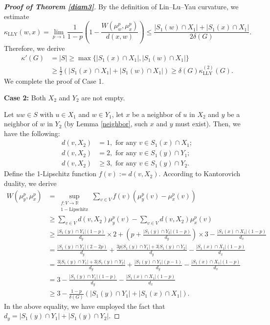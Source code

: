 \documentclass[11pt,bezier]{article}
\theoremstyle{definition}
\theoremstyle{definition}
\theoremstyle{nonumber}
\begin{document}
\begin{proof}[\bf{Proof of Theorem \ref{diam3}}]
By the definition of Lin--Lu--Yau curvature, we estimate
$$
\kappa_{\mathrm{LLY}}(w, x) = \lim_{p \to 1} \frac{1}{1-p} \left( 1 - \frac{W(\mu_w^p, \mu_x^p)}{d(x, w)} \right) \leq \frac{|S_1(w) \cap X_1| + |S_1(x) \cap X_1|}{2\delta(G)}.
$$
Therefore, we derive
\begin{align*}
\kappa'(G) &= |S| \geq \max\{|S_1(x) \cap X_1|, |S_1(w) \cap X_1|\}\\
&\geq \frac{1}{2} (|S_1(x) \cap X_1| + |S_1(w) \cap X_1|) \geq \delta(G) \kappa_{\mathrm{LLY}}^{(2)}(G).
\end{align*}
We complete the proof of Case 1.

\textbf{Case 2:} Both $X_2$ and $Y_2$ are not empty.

Let $uw \in S$ with $u\in X_1$ and $w\in Y_1$,  let $x$ be a neighbor of $u$ in $X_2$ and $y$ be a neighbor of $w$ in $Y_2$ (by Lemma \ref{neighbor}, such $x$ and $y$ must exist). Then, we have the following:
\begin{align*} 
d(v, X_2) &= 1, \text{ for any } v \in S_1(x) \cap X_1;\\
d(v, X_2) &= 2, \text{ for any } v \in S_1(y) \cap Y_1;\\
d(v, X_2) &\geq 3, \text{ for any } v \in S_1(y) \cap Y_2.
\end{align*}
Define the 1-Lipschitz function $f(v):=d(v, X_2)$. According to Kantorovich duality, we derive
\begin{align*}
W(\mu_y^p, \mu_x^p) &= \sup_{\substack{f: V \to \mathbb{R} \\ 1-\text{Lipschitz}}} \sum_{v \in V} f(v) \left( \mu_y^p(v) - \mu_x^p(v) \right)\\
&\geq \sum_{v \in V} d(v, X_2) \mu_y^p(v) - \sum_{v \in V} d(v, X_2) \mu_x^p(v)\\
&\geq \frac{|S_1(y) \cap Y_1|(1-p)}{d_y}\times 2 + \left( p + \frac{|S_1(y) \cap Y_2|(1-p)}{d_y} \right) \times 3 - \frac{|S_1(x) \cap X_1|(1-p)}{d_x}\\
&= \frac{|S_1(y) \cap Y_1|(2-2p)}{d_y} +  \frac{3p|S_1(y) \cap Y_1|+3|S_1(y) \cap Y_2|}{d_y} - \frac{|S_1(x) \cap X_1|(1-p)}{d_x}\\
&= \frac{3|S_1(y) \cap Y_1|+3|S_1(y) \cap Y_2|}{d_y} +  \frac{|S_1(y) \cap Y_1|(p-1)}{d_y} - \frac{|S_1(x) \cap X_1|(1-p)}{d_x}\\
&= 3 - \frac{|S_1(y) \cap Y_1|(1-p)}{d_y} - \frac{|S_1(x) \cap X_1|(1-p)}{d_x}\\
&\geq 3 - \frac{1-p}{\delta(G)} \left( |S_1(y) \cap Y_1| + |S_1(x) \cap X_1| \right).
\end{align*}
In the above equality, we have employed the fact that $d_y = |S_1(y) \cap Y_1| + |S_1(y) \cap Y_2|$.


\end{proof}
\end{document}
